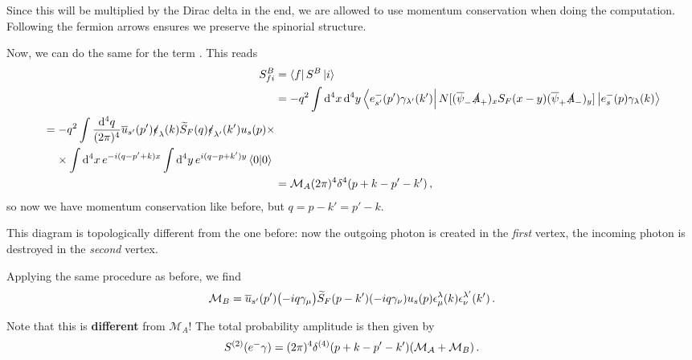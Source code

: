 \documentclass[main.tex]{subfiles}
\begin{document}
Since this will be multiplied by the Dirac delta in the end, we are allowed to use momentum conservation when doing the computation. 
Following the fermion arrows ensures we preserve the spinorial structure. 

Now, we can do the same for the term . This reads 
\begin{align}
S^{B}_{fi} &= \bra{f} S^{B} \ket{i}  \\
&= - q^2 \int \dd[4]{x} \dd[4]{y} 
\bra{e^{-}_{s'} (p') \gamma_{\lambda'} (k')} 
N [(\overline{\psi}_{-} \slashed{A}_{+})_{x} S_F (x-y) (\overline{\psi}_{+} \slashed{A}_{-})_{y}]
\ket{e^{-}_{s} (p) \gamma_\lambda (k)}  \\
\begin{split}
&= -q^2 \int \frac{ \dd[4]{q}}{(2 \pi )^{4}} \overline{u}_{s'} (p') \slashed{\epsilon }_{\lambda} (k) \widetilde{S}_{F} (q) \slashed{\epsilon }_{\lambda' } (k') u_s (p) \times \\
&\phantom{=}\  \times \int \dd[4]{x} e^{-i (q - p' + k )x}
\int \dd[4]{y} e^{i (q-p +k') y} \braket{0}{0} 
\end{split}  \\
&= \mathcal{M}_{A} (2 \pi )^{4} \delta^{4} (p + k - p' - k') 
\,,
\end{align}
%
so now we have momentum conservation like before, but \(q = p - k' = p' - k\). 

This diagram is topologically different from the one before: now the outgoing photon is created in the \emph{first} vertex, the incoming photon is destroyed in the \emph{second} vertex.

Applying the same procedure as before, we find 
%
\begin{align}
\mathcal{M}_{B} = \overline{u}_{s'} (p') \qty(-iq \gamma_{\mu })
\widetilde{S}_{F} (p - k') \qty(-i q \gamma_{\nu }) u_s (p) 
\epsilon^{\lambda }_{\mu } (k) \epsilon^{\lambda '}_{\nu } (k')
\,.
\end{align}

Note that this is \textbf{different} from \(\mathcal{M}_A\)! 
The total probability amplitude is then given by 
%
\begin{align}
S^{(2)} (e^{-} \gamma ) = (2\pi )^{4} \delta^{(4)}
(p + k - p' - k') \qty(\mathcal{M_A} + \mathcal{M}_{B}) 
\,.
\end{align}
\end{document}
